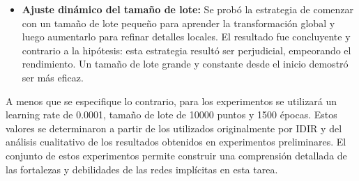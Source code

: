 \begin{itemize}
\item \textbf{Ajuste dinámico del tamaño de lote:} Se probó la estrategia de comenzar con un tamaño de lote pequeño para aprender la transformación global y luego aumentarlo para refinar detalles locales. El resultado fue concluyente y contrario a la hipótesis: esta estrategia resultó ser perjudicial, empeorando el rendimiento. Un tamaño de lote grande y constante desde el inicio demostró ser más eficaz.

\end{itemize}

A menos que se especifique lo contrario, para los experimentos se utilizará un learning rate de 0.0001, tamaño de lote de 10000 puntos y 1500 épocas. Estos valores se determinaron a partir de los utilizados originalmente por IDIR y del análisis cualitativo de los resultados obtenidos en experimentos preliminares. El conjunto de estos experimentos permite construir una comprensión detallada de las fortalezas y debilidades de las redes implícitas en esta tarea.

